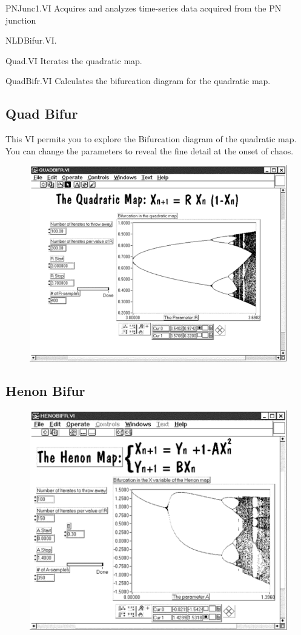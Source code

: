 \documentclass{../lab}
\begin{document}
PNJunc1.VI Acquires and analyzes time-series data acquired from the PN junction

NLDBifur.VI.

Quad.VI Iterates the quadratic map.

QuadBifr.VI Calculates the bifurcation diagram for the quadratic map.

\subsection{Quad Bifur}

This VI permits you to explore the Bifurcation diagram of the quadratic map. You can change the parameters to reveal the fine detail at the onset of chaos.


\begin{figure}[h]
    \centering
    \href{http://experimentationlab.berkeley.edu/sites/default/files/images/Nldimage138.gif}{\includegraphics[width=0.5\linewidth]{images/Nldimage138.png}}
    \caption{}
    \label{fig:Nldimage138}
\end{figure}

\subsection{Henon Bifur}


\begin{figure}[h]
    \centering
    \href{http://experimentationlab.berkeley.edu/sites/default/files/images/Nldimage139.gif}{\includegraphics[width=0.5\linewidth]{images/Nldimage139.png}}
    \caption{}
    \label{fig:Nldimage139}
\end{figure}
\end{document}
